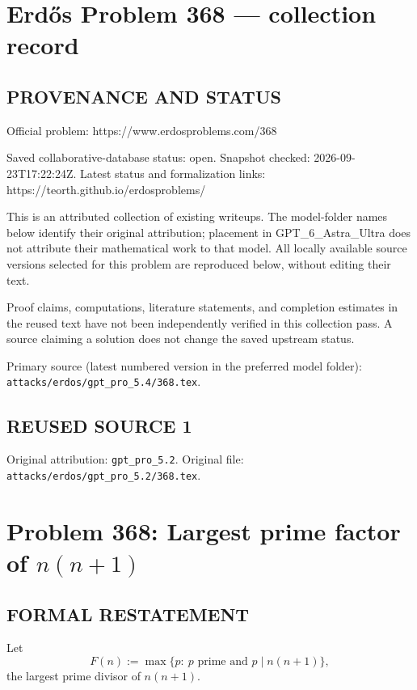 \section*{Erd\H{o}s Problem 368 --- collection record}

\subsection*{PROVENANCE AND STATUS}
Official problem: https://www.erdosproblems.com/368

Saved collaborative-database status: open.
Snapshot checked: 2026-09-23T17:22:24Z.
Latest status and formalization links: https://teorth.github.io/erdosproblems/

This is an attributed collection of existing writeups. The model-folder names below identify their original attribution; placement in GPT\_6\_Astra\_Ultra does not attribute their mathematical work to that model. All locally available source versions selected for this problem are reproduced below, without editing their text.

Proof claims, computations, literature statements, and completion estimates in the reused text have not been independently verified in this collection pass. A source claiming a solution does not change the saved upstream status.

Primary source (latest numbered version in the preferred model folder): \texttt{attacks/erdos/gpt\_pro\_5.4/368.tex}.

\subsection*{REUSED SOURCE 1}
Original attribution: \texttt{gpt\_pro\_5.2}.
Original file: \texttt{attacks/erdos/gpt\_pro\_5.2/368.tex}.

\section*{Problem 368: Largest prime factor of $n(n+1)$}

\subsection*{FORMAL RESTATEMENT}
Let
\[
F(n) := \max\{p:\ p\text{ prime and }p\mid n(n+1)\},
\]
the largest prime divisor of $n(n+1)$.

